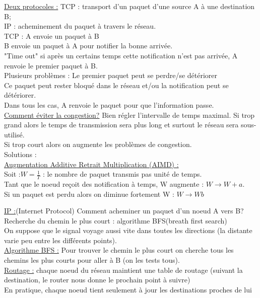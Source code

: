 \documentclass[../main.tex]{subfiles}
\begin{document}
\underline{Deux protocoles :} TCP : transport d'un paquet d'une source A à une destination B;\\
IP : acheminement du paquet à travers le réseau.\\

TCP : A envoie un paquet à B\\
B envoie un paquet à A pour notifier la bonne arrivée. \\
"Time out" si après un certains temps cette notification n'est pas arrivée, A renvoie le premier paquet à B.\\
Plusieurs problèmes : Le premier paquet peut se perdre/se détériorer\\
Ce paquet peut rester bloqué dans le réseau et/ou la notification peut se détériorer.\\
Dans tous les cas, A renvoie le paquet pour que l'information passe.\\

\quad \underline{Comment éviter la congestion?}
Bien régler l'intervalle de temps maximal. Si trop grand alors le temps de transmission sera plus long et surtout le réseau sera sous-utilisé.\\
Si trop court alors on augmente les problèmes de congestion.\\

Solutions :\\
\quad \underline{Augmentation Additive Retrait Multiplication (AIMD) :}\\
Soit :$W = \frac{1}{T}$ : le nombre de paquet transmis pas unité de temps.\\
Tant que le noeud reçoit des notification à temps, W augmente : $W \rightarrow W+a$. \\
Si un paquet est perdu alors on diminue fortement W : $W \rightarrow Wb$

\quad \underline{IP :}(Internet Protocol) Comment acheminer un paquet d'un noeud A vers B?\\
Recherche du chemin le plus court : algorithme BFS(breath first search)\\
On suppose que le signal voyage aussi vite dans toutes les directions (la distante varie peu entre les différents points). \\
\underline{Algorithme BFS :} Pour trouver le chemin le plus court on cherche tous les chemins les plus courts pour aller à B (on les tests tous).\\

\quad \underline{Routage :} chaque noeud du réseau maintient une table de routage (suivant la destination, le router nous donne le prochain point à suivre)\\
En pratique, chaque noeud tient seulement à jour les destinations proches de lui\\
\end{document}
